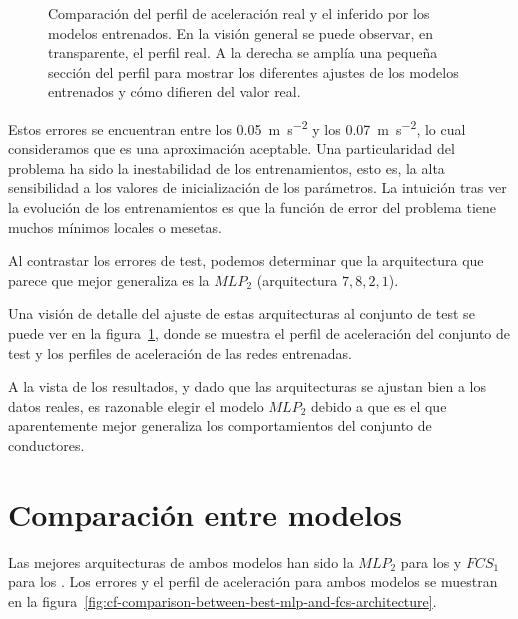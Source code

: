 \begin{figure}[!b]
	\centering
	\qquad
	\caption[Comparación del perfil de aceleración real y el inferido por los modelos entrenados]{Comparación del perfil de aceleración real y el inferido por los modelos entrenados. En la visión general se puede observar, en transparente, el perfil real. A la derecha se amplía una pequeña sección del perfil para mostrar los diferentes ajustes de los modelos entrenados y cómo difieren del valor real.}
	\label{fig:cf-mlp-test-comparisons}
\end{figure}

Estos errores se encuentran entre los \SI{0.05}{\metre\per\square\second} y los \SI{0.07}{\metre\per\square\second}, lo cual consideramos que es una aproximación aceptable. Una particularidad del problema ha sido la inestabilidad de los entrenamientos, esto es, la alta sensibilidad a los valores de inicialización de los parámetros. La intuición tras ver la evolución de los entrenamientos es que la función de error del problema tiene muchos mínimos locales o mesetas.

Al contrastar los errores de test, podemos determinar que la arquitectura que parece que mejor generaliza es la $MLP_2$ (arquitectura $7, 8, 2, 1$).

Una visión de detalle del ajuste de estas arquitecturas al conjunto de test se puede ver en la figura~\ref{fig:cf-mlp-test-comparisons}, donde se muestra el perfil de aceleración del conjunto de test y los perfiles de aceleración de las redes entrenadas.

A la vista de los resultados, y dado que las arquitecturas se ajustan bien a los datos reales, es razonable elegir el modelo $MLP_2$ debido a que es el que aparentemente mejor generaliza los comportamientos del conjunto de conductores.

\section{Comparación entre modelos}

Las mejores arquitecturas de ambos modelos han sido la $MLP_2$ para los  y $FCS_1$ para los . Los errores y el perfil de aceleración para ambos modelos se muestran en la figura~\ref{fig:cf-comparison-between-best-mlp-and-fcs-architecture}.

